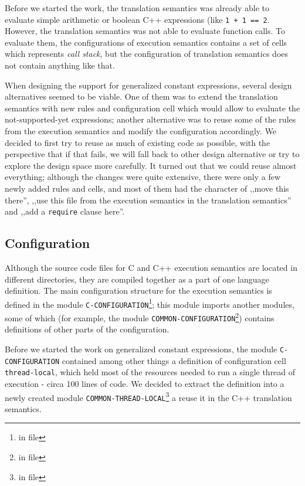 \documentclass[nolot,nolof,nocover,printed]{fithesis3}
\newcommand{\Project}{Project\xspace}
\begin{document}
Before we started the work, the translation semantics was already able to evaluate simple arithmetic or boolean C++ expressions (like \lstinline|1 + 1 == 2|. However, the translation semantics was not able to evaluate function calls. To evaluate them, the configurations of execution semantics contains a set of cells which represents \textit{call stack}, but the configuration of translation semantics does not contain anything like that.

When designing the support for generalized constant expressions, several design alternatives seemed to be viable. One of them was to extend the translation semantics with new rules and configuration cell which would allow to evaluate the not-supported-yet expressions; another alternative was to reuse some of the rules from the execution semantics and modify the configuration accordingly. We decided to first try to reuse as much of existing code as possible, with the perspective that if that fails, we will fall back to other design alternative or try to explore the design space more carefully. It turned out that we could reuse almost everything; although the changes were quite extensive, there were only a few newly added rules and cells, and most of them had the character of ,,move this there'', ,,use this file from the execution semantics in the translation semantics'' and ,,add a \texttt{require} clause here''.

\subsection{Configuration}


Although the source code files for C and C++ execution semantics are located in different directories, they are compiled together as a part of one language definition. The main configuration structure for the execution semantics is defined in the module \texttt{C-CONFIGURATION}\footnote{in file }; this module imports another modules, some of which (for example, the module \texttt{COMMON-CONFIGURATION}\footnote{in file }) contains definitions of other parts of the configuration.


Before we started the work on generalized constant expressions, the module \texttt{C-CONFIGURATION} contained among other things a definition of configuration cell \texttt{thread-local}, which held most of the resources needed to run a single thread of execution - circa 100 lines of code. We decided to extract the definition into a newly created module \texttt{COMMON-THREAD-LOCAL}\footnote{in file } a reuse it in the C++ translation semantics.
\end{document}
